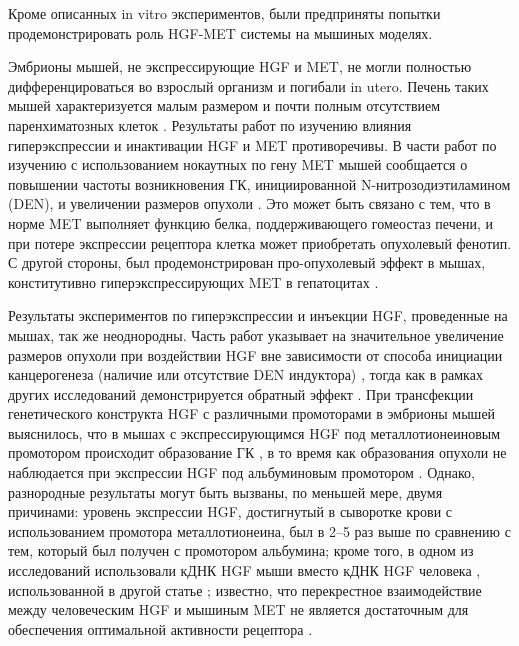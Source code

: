Кроме описанных in vitro экспериментов, были предприняты попытки продемонстрировать роль HGF-MET системы на мышиных моделях. 

Эмбрионы мышей, не экспрессирующие HGF и MET, не могли полностью дифференцироваться во взрослый организм и погибали in utero. Печень таких мышей характеризуется малым размером и почти полным отсутствием паренхиматозных клеток \cite{schmidt_scatter_1995, uehara_placental_1995}. Результаты работ по изучению влияния гиперэкспрессии и инактивации HGF и MET противоречивы. В части работ по изучению с использованием нокаутных по гену MET мышей сообщается о повышении частоты возникновения ГК, инициированной N-нитрозодиэтиламином (DEN), и увеличении размеров опухоли \cite{marx-stoelting_hepatocarcinogenesis_2009, takami_loss_2007}. Это может быть связано с тем, что в норме MET выполняет функцию белка, поддерживающего гомеостаз печени, и при потере экспрессии рецептора клетка может приобретать опухолевый фенотип. С другой стороны, был продемонстрирован про-опухолевый эффект в мышах, конститутивно гиперэкспрессирующих MET в гепатоцитах \cite{tward_genomic_2005}.  

Результаты экспериментов по гиперэкспрессии и инъекции HGF, проведенные на мышах, так же неоднородны. Часть работ указывает на значительное увеличение размеров опухоли при воздействии HGF вне зависимости от способа инициации канцерогенеза (наличие или отсутствие DEN индуктора) \cite{yaono_hepatocyte_1995, ogasawara_hepatocyte_1998}, тогда как в рамках других исследований демонстрируется обратный эффект \cite{liu_hepatocyte_1995}. При трансфекции генетического конструкта HGF с различными промоторами в эмбрионы мышей выяснилось, что в мышах с экспрессирующимся HGF под металлотионеиновым промотором происходит образование ГК \cite{horiguchi_hepatocyte_2002, sakata_hepatocyte_1996}, в то время как образования опухоли не наблюдается при экспрессии HGF под альбуминовым промотором \cite{shiota_hepatocyte_1994}. Однако, разнородные результаты могут быть вызваны, по меньшей мере, двумя причинами: уровень экспрессии HGF, достигнутый в сыворотке крови с использованием промотора металлотионеина, был в 2–5 раз выше по сравнению с тем, который был получен с промотором альбумина; кроме того, в одном из исследований использовали кДНК HGF мыши вместо кДНК HGF человека \cite{sakata_hepatocyte_1996}, использованной в другой статье \cite{shiota_hepatocyte_1994}; известно, что перекрестное взаимодействие между человеческим HGF и мышиным MET не является достаточным для обеспечения оптимальной активности рецептора \cite{giordano_met_2014}. 


